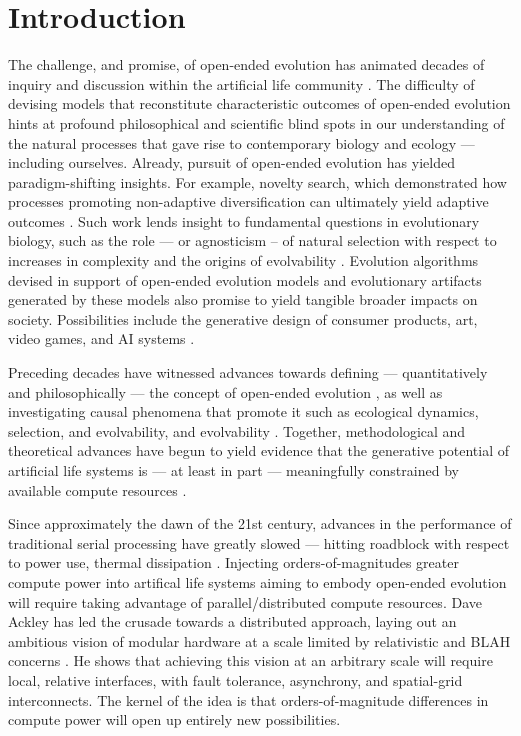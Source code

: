 \section{Introduction}

The challenge, and promise, of open-ended evolution has animated decades of inquiry and discussion within the artificial life community \citep{packard2019overview}.
The difficulty of devising models that reconstitute characteristic outcomes of open-ended evolution hints at profound philosophical and scientific blind spots in our understanding of the natural processes that gave rise to contemporary biology and ecology --- including ourselves.
Already, pursuit of open-ended evolution has yielded paradigm-shifting insights.
For example, novelty search, which demonstrated how processes promoting non-adaptive diversification can ultimately yield adaptive outcomes \citep{lehman2011abandoning}.
Such work lends insight to fundamental questions in evolutionary biology, such as the role --- or agnosticism -- of natural selection with respect to increases in complexity \citep{lehman2012evolution, lynch2007frailty} and the origins of evolvability \citep{lehman2013evolvability, kirschner1998evolvability}.
Evolution algorithms devised in support of open-ended evolution models and evolutionary artifacts generated by these models also promise to yield tangible broader impacts on society.
Possibilities include the generative design of consumer products, art, video games, and AI systems \citep{nguyen2015innovation, stanley2017open}.

Preceding decades have witnessed advances towards defining --- quantitatively and philosophically --- the concept of open-ended evolution \citep{lehman2012beyond, dolson2019modes, bedau1998classification}, as well as investigating causal phenomena that promote it such as ecological dynamics, selection, and evolvability, and evolvability \citep{dolson2019constructive, soros2014identifying, huizinga2018emergence}.
Together, methodological and theoretical advances have begun to yield evidence that the generative potential of artificial life systems is --- at least in part --- meaningfully constrained by available compute resources \citep{channon2019maximum}.

Since approximately the dawn of the 21st century, advances in the performance of traditional serial processing have greatly slowed ---  hitting roadblock with respect to power use, thermal dissipation \citep{sutter2005free}.
Injecting orders-of-magnitudes greater compute power into artifical life systems aiming to embody open-ended evolution will require taking advantage of parallel/distributed compute resources.
Dave Ackley has led the crusade towards a distributed approach, laying out an ambitious vision of modular hardware at a scale limited by relativistic and BLAH concerns \citep{ackley2011pursue}.
He shows that achieving this vision at an arbitrary scale will require local, relative interfaces, with fault tolerance, asynchrony, and spatial-grid interconnects.
The kernel of the idea is that orders-of-magnitude differences in compute power will open up entirely new possibilities.

